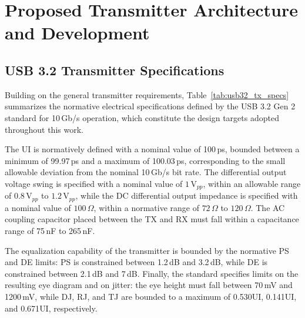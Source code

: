 \chapter{Proposed Transmitter Architecture and Development} \label{chap:ch3}


\section{\acs*{USB} 3.2 Transmitter Specifications}\label{sec:usb32_specs}

Building on the general transmitter requirements, Table~\ref{tab:usb32_tx_specs} summarizes the normative electrical specifications defined by the \ac{USB} 3.2 Gen 2 standard for 10\,Gb/s operation, which constitute the design targets adopted throughout this work.

The \ac{UI} is normatively defined with a nominal value of 100\,ps, bounded between a minimum of 99.97\,ps and a maximum of 100.03\,ps, corresponding to the small allowable deviation from the nominal 10\,Gb/s bit rate. The differential output voltage swing is specified with a nominal value of $1\,\text{V}_{pp}$, within an allowable range of $0.8\,\text{V}_{pp}$ to $1.2\,\text{V}_{pp}$, while the \ac{DC} differential output impedance is specified with a nominal value of $100\,\Omega$, within a normative range of $72\,\Omega$ to $120\,\Omega$. The \ac{AC} coupling capacitor placed between the \ac{TX} and \ac{RX} must fall within a capacitance range of 75\,nF to 265\,nF.

The equalization capability of the transmitter is bounded by the normative \ac{PS} and \ac{DE} limits: \ac{PS} is constrained between 1.2\,dB and 3.2\,dB, while \ac{DE} is constrained between 2.1\,dB and 7\,dB. Finally, the standard specifies limits on the resulting eye diagram and on jitter: the eye height must fall between 70\,mV and 1200\,mV, while \ac{DJ}, \ac{RJ}, and \ac{TJ} are bounded to a maximum of 0.530\ac{UI}, 0.141\ac{UI}, and 0.671\ac{UI}, respectively.


